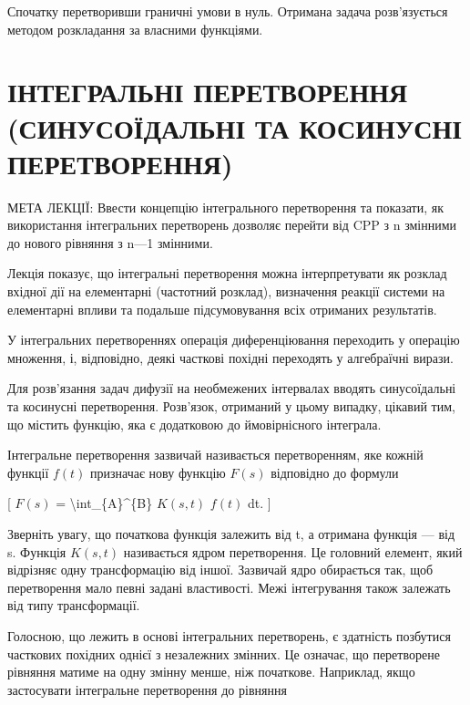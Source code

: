 \documentclass[
]{article}
\begin{document}
{{Спочатку перетворивши граничні умови в нуль. Отримана задача
розв'язується методом розкладання за власними функціями.

\section{ІНТЕГРАЛЬНІ ПЕРЕТВОРЕННЯ (СИНУСОЇДАЛЬНІ ТА КОСИНУСНІ
ПЕРЕТВОРЕННЯ)}\label{ux456ux43dux442ux435ux433ux440ux430ux43bux44cux43dux456-ux43fux435ux440ux435ux442ux432ux43eux440ux435ux43dux43dux44f-ux441ux438ux43dux443ux441ux43eux457ux434ux430ux43bux44cux43dux456-ux442ux430-ux43aux43eux441ux438ux43dux443ux441ux43dux456-ux43fux435ux440ux435ux442ux432ux43eux440ux435ux43dux43dux44f}

МЕТА ЛЕКЦІЇ: Ввести концепцію інтегрального перетворення та показати, як
використання інтегральних перетворень дозволяє перейти від CPP з n
змінними до нового рівняння з n---1 змінними.

Лекція показує, що інтегральні перетворення можна інтерпретувати як
розклад вхідної дії на елементарні (частотний розклад), визначення
реакції системи на елементарні впливи та подальше підсумовування всіх
отриманих результатів.

У інтегральних перетвореннях операція диференціювання переходить у
операцію множення, і, відповідно, деякі часткові похідні переходять у
алгебраїчні вирази.

Для розв'язання задач дифузії на необмежених інтервалах вводять
синусоїдальні та косинусні перетворення. Розв'язок, отриманий у цьому
випадку, цікавий тим, що містить функцію, яка є додатковою до
ймовірнісного інтеграла.

Інтегральне перетворення зазвичай називається перетворенням, яке кожній
функції \(f(t)\) призначає нову функцію \(F(s)\) відповідно до формули

{[} \(F(s)\) = \textbackslash int\_\{A\}\^{}\{B\} \(K(s, t)\) \(f(t)\)
dt. {]}

Зверніть увагу, що початкова функція залежить від t, а отримана функція
--- від s. Функція \(K(s,t)\) називається ядром перетворення. Це
головний елемент, який відрізняє одну трансформацію від іншої. Зазвичай
ядро обирається так, щоб перетворення мало певні задані властивості.
Межі інтегрування також залежать від типу трансформації.

Голосною, що лежить в основі інтегральних перетворень, є здатність
позбутися часткових похідних однієї з незалежних змінних. Це означає, що
перетворене рівняння матиме на одну змінну менше, ніж початкове.
Наприклад, якщо застосувати інтегральне перетворення до рівняння

}}
\end{document}
